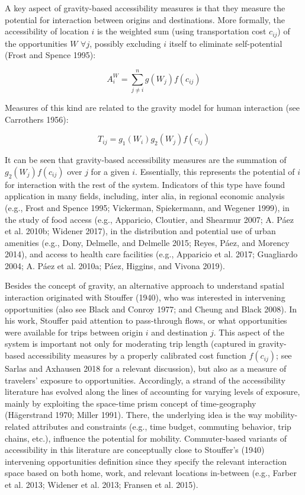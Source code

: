 \documentclass[]{elsarticle} %
\begin{document}
A key aspect of gravity-based accessibility measures is that they
measure the potential for interaction between origins and destinations.
More formally, the accessibility of location \(i\) is the weighted sum
(using transportation cost \(c_{ij}\)) of the opportunities \(W\)
\(\forall j\), possibly excluding \(i\) itself to eliminate
self-potential (Frost and Spence 1995):

\begin{equation}\label{f:access}
A_i^W = \sum_{j\ne i}^n{g(W_j)f(c_{ij})}
\end{equation}

Measures of this kind are related to the gravity model for human
interaction (see Carrothers 1956):

\begin{equation}\label{f:gravity}
T_{ij} = g_1(W_i)g_2(W_j)f(c_{ij})
\end{equation}

It can be seen that gravity-based accessibility measures are the
summation of \(g_2(W_j)f(c_{ij})\) over \(j\) for a given \(i\).
Essentially, this represents the potential of \(i\) for interaction with
the rest of the system. Indicators of this type have found application
in many fields, including, inter alia, in regional economic analysis
(e.g., Frost and Spence 1995; Vickerman, Spiekermann, and Wegener 1999),
in the study of food access (e.g., Apparicio, Cloutier, and Shearmur
2007; A. Páez et al. 2010b; Widener 2017), in the distribution and
potential use of urban amenities (e.g., Dony, Delmelle, and Delmelle
2015; Reyes, Páez, and Morency 2014), and access to health care
facilities (e.g., Apparicio et al. 2017; Guagliardo 2004; A. Páez et al.
2010a; Páez, Higgins, and Vivona 2019).

Besides the concept of gravity, an alternative approach to understand
spatial interaction originated with Stouffer (1940), who was interested
in intervening opportunities (also see Black and Conroy 1977; and Cheung
and Black 2008). In his work, Stouffer paid attention to pass-through
flows, or what opportunities were available for trips between origin
\(i\) and destination \(j\). This aspect of the system is important not
only for moderating trip length (captured in gravity-based accessibility
measures by a properly calibrated cost function \(f(c_{ij})\); see
Sarlas and Axhausen 2018 for a relevant discussion), but also as a
measure of travelers' exposure to opportunities. Accordingly, a strand
of the accessibility literature has evolved along the lines of
accounting for varying levels of exposure, mainly by exploiting the
space-time prism concept of time-geography (Hägerstrand 1970; Miller
1991). There, the underlying idea is the way mobility-related attributes
and constraints (e.g., time budget, commuting behavior, trip chains,
etc.), influence the potential for mobility. Commuter-based variants of
accessibility in this literature are conceptually close to Stouffer's
(1940) intervening opportunities definition since they specify the
relevant interaction space based on both home, work, and relevant
locations in-between (e.g., Farber et al. 2013; Widener et al. 2013;
Fransen et al. 2015).
\end{document}
